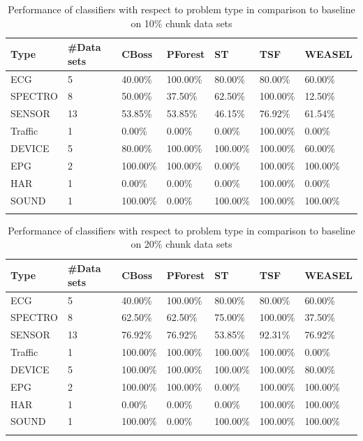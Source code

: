 \begin{table}[hbt!]
	\setlength\extrarowheight{2pt} %
	\begin{tabularx}{\textwidth}{|X|X|X|X|X|X|X|}
	\hline
	\textbf{Type} & \textbf{\#Data sets} & \textbf{CBoss} & \textbf{PForest} & \textbf{ST} & \textbf{TSF} & \textbf{WEASEL} \\ \hline
		ECG & 5 & 40.00\% & 100.00\% & 80.00\% & 80.00\% & 60.00\% \\ \hline
		SPECTRO & 8 &50.00\% & 37.50\% & 62.50\% & 100.00\% & 12.50\% \\ \hline
		SENSOR & 13 & 53.85\% & 53.85\% & 46.15\% & 76.92\% & 61.54\% \\ \hline
		Traffic & 1 & 0.00\% & 0.00\% & 0.00\% & 100.00\% & 0.00\% \\ \hline
		DEVICE & 5 & 80.00\% & 100.00\% & 100.00\% & 100.00\% & 60.00\% \\ \hline
		EPG & 2 & 100.00\% & 100.00\% & 0.00\% & 100.00\% & 100.00\% \\ \hline
		HAR & 1 & 0.00\% & 0.00\% & 0.00\% & 100.00\% & 0.00\% \\ \hline
		SOUND & 1 & 100.00\% & 0.00\% & 100.00\% & 100.00\% & 100.00\% \\ \hline
  \caption{Performance of classifiers with respect to problem type in comparison to baseline on 10\% chunk data sets}
  \label{TableType10}
  \end{tabularx}
\end{table}

\begin{table}[hbt!]
	\setlength\extrarowheight{2pt} %
	\begin{tabularx}{\textwidth}{|X|X|X|X|X|X|X|}
	\hline
	\textbf{Type} & \textbf{\#Data sets} & \textbf{CBoss} & \textbf{PForest} & \textbf{ST} & \textbf{TSF} & \textbf{WEASEL} \\ \hline
		ECG & 5 & 40.00\% & 100.00\% & 80.00\% & 80.00\% & 60.00\% \\ \hline
		SPECTRO & 8 &62.50\% & 62.50\% & 75.00\% & 100.00\% & 37.50\% \\ \hline
		SENSOR & 13 & 76.92\% & 76.92\% & 53.85\% & 92.31\% & 76.92\% \\ \hline
		Traffic & 1 & 100.00\% & 100.00\% & 100.00\% & 100.00\% & 0.00\% \\ \hline
		DEVICE & 5 & 100.00\% & 100.00\% & 100.00\% & 100.00\% & 80.00\% \\ \hline
		EPG & 2 & 100.00\% & 100.00\% & 0.00\% & 100.00\% & 100.00\% \\ \hline
		HAR & 1 & 0.00\% & 0.00\% & 0.00\% & 100.00\% & 100.00\% \\ \hline
		SOUND & 1 & 100.00\% & 0.00\% & 100.00\% & 100.00\% & 100.00\% \\ \hline
  \caption{Performance of classifiers with respect to problem type in comparison to baseline on 20\% chunk data sets}
  \label{TableType20}
  \end{tabularx}
\end{table}

